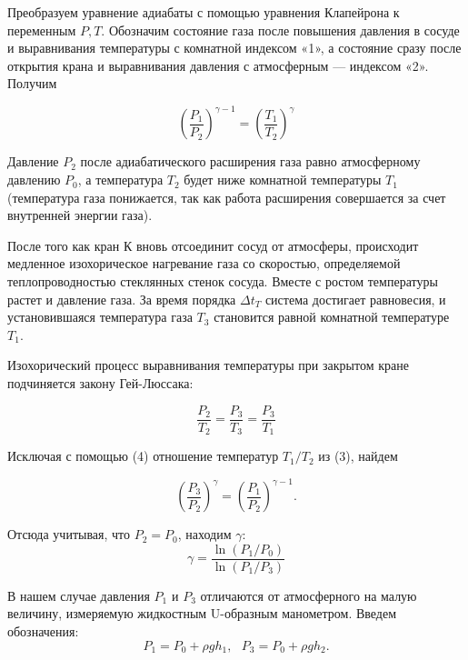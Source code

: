 \documentclass[a4paper,12pt]{article} %
\begin{document}
Преобразуем уравнение адиабаты с помощью уравнения Клапейрона к переменным $P, T$. Обозначим состояние газа после повышения давления в сосуде и выравнивания температуры с комнатной индексом «1», а состояние сразу после открытия крана и выравнивания давления с атмосферным — индексом «2». Получим

	\begin{equation}
		\left(\frac{P_{1}}{P_{2}}\right)^{\gamma - 1} = \left(\frac{T_{1}}{T_{2}}\right)^{\gamma}
	\end{equation}

Давление $P_{2}$ после адиабатического расширения газа равно атмосферному давлению $P_{0}$, а температура $T_{2}$ будет ниже комнатной температуры $T_{1}$ (температура газа понижается, так как работа расширения совершается за счет внутренней энергии газа).


После того как кран К вновь отсоединит сосуд от атмосферы, происходит медленное изохорическое нагревание газа со скоростью, определяемой теплопроводностью стеклянных стенок сосуда. Вместе с ростом температуры растет и давление газа. За время порядка $\Delta t_{T}$
система достигает равновесия, и установившаяся температура газа $T_{3}$ становится равной комнатной температуре $T_{1}$.


Изохорический процесс выравнивания температуры при закрытом кране подчиняется закону Гей-Люссака:

	\begin{equation}
		\frac{P_{2}}{T_{2}} = \frac{P_{3}}{T_{3}} = \frac{P_{3}}{T_{1}} 
	\end{equation}


\noindent Исключая с помощью (4) отношение температур $T_{1}/T_{2}$ из (3), найдем

	\begin{equation*}
			\left(\frac{P_{3}}{P_{2}}\right)^{\gamma} = 	\left(\frac{P_{1}}{P_{2}}\right)^{\gamma - 1}.
	\end{equation*}

\newpage
\noindent Отсюда учитывая, что $P_{2} = P_{0}$, находим $\gamma$:
	\begin{equation}
		\gamma = \frac{\ln{\left(P_{1}/P_{0}\right)}}{\ln{\left(P_{1}/P_{3}\right)}}
	\end{equation}


В нашем случае давления $P_{1}$ и $P_{3}$ отличаются от атмосферного на малую величину, измеряемую жидкостным U-образным манометром. Введем обозначения:
	\begin{equation*}
		P_{1} = P_{0} + \rho gh_{1}, \text{     } P_{3} = P_{0} + \rho gh_{2}.
	\end{equation*}
\end{document}
